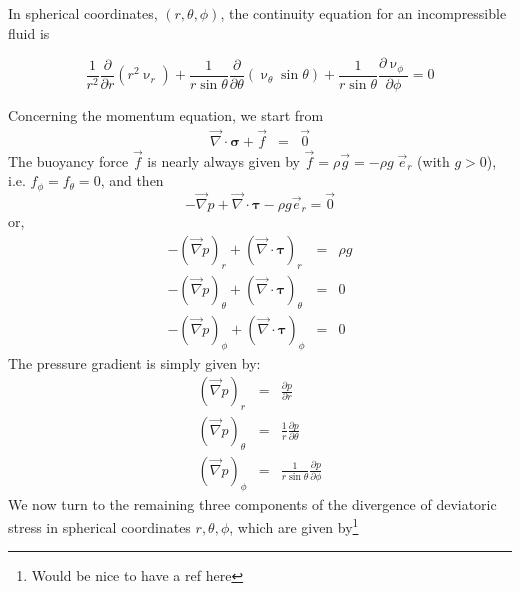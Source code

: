 In spherical coordinates, $(r,\theta,\phi)$, the continuity equation for an incompressible fluid is 
\begin{mdframed}[backgroundcolor=blue!5]
\begin{equation}
\frac{1}{r^2} \frac{\partial}{\partial r} (r^2 \upnu_r) + 
\frac{1}{r \sin \theta} \frac{\partial}{\partial \theta} (\upnu_\theta \sin \theta)+
\frac{1}{r \sin \theta} \frac{\partial \upnu_\phi}{\partial \phi} = 0
\end{equation}
\end{mdframed}
Concerning the momentum equation, we start from 
\begin{eqnarray}
{\vec \nabla}\cdot {\bm \sigma} + {\vec f} &=& \vec{0} 
\end{eqnarray}
The buoyancy force $\vec{f}$ is nearly always given by 
$\vec{f}=\rho \vec{g} = - \rho g \; \vec{e}_r$ (with $g>0$), i.e. $f_\phi=f_\theta=0$, and then
\[
- {\vec \nabla}p + {\vec \nabla}\cdot {\bm \tau} - \rho g \vec{e}_r = \vec{0}
\]
or,
\begin{eqnarray}
- ({\vec \nabla}p)_r      + ({\vec \nabla}\cdot {\bm \tau})_r     &=& \rho {g} \nonumber\\
- ({\vec \nabla}p)_\theta + ({\vec \nabla}\cdot {\bm \tau})_\theta&=&0  \nonumber\\
- ({\vec \nabla}p)_\phi   + ({\vec \nabla}\cdot {\bm \tau})_\phi  &=&0  \nonumber
\end{eqnarray}
The pressure gradient is simply given by:
\begin{eqnarray}
({\vec \nabla}p)_r &=& \frac{\partial p}{\partial r}  \nonumber\\
({\vec \nabla}p)_\theta &=& \frac{1}{r}\frac{\partial p}{\partial \theta}  \nonumber\\
({\vec \nabla}p)_\phi &=& \frac{1}{r\sin\theta}\frac{\partial p}{\partial \phi}  \nonumber
\end{eqnarray}
We now turn to the remaining three components of the divergence of deviatoric stress in 
spherical coordinates $r,\theta,\phi$, which are given by\footnote{Would be nice to 
have a ref here} %

